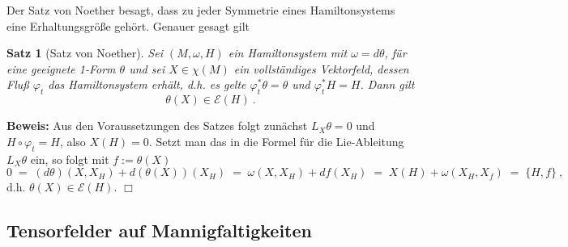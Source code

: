 \documentclass[12pt,a4paper]{article}
\newtheorem{Satz}[Lemma]{Satz}
\def\proof{\noindent\textbf{Beweis:}\quad}
\def\qed{\quad\hfill\ensuremath{\Box}}
\begin{document}
\bigskip

Der Satz von Noether besagt, dass zu jeder Symmetrie eines Hamiltonsystems eine Erhaltungsgr\"o\ss e
geh\"ort. Genauer gesagt gilt

\begin{Satz}[Satz von Noether]
Sei $(M, \omega, H)$ ein Hamiltonsystem mit $\omega = d\theta$, f\"ur eine geeignete 1-Form $\theta$
und sei $X\in \chi(M)$ ein vollst\"andiges Vektorfeld, dessen Flu\ss{} $\varphi_t$ das Hamiltonsystem
erh\"alt, d.h. es gelte $\varphi_t^*\theta = \theta$ und $\varphi_t^* H = H$. Dann gilt
$$
\theta(X) \in \mathcal E(H) \ .
$$
\end{Satz}
\proof
Aus den Voraussetzungen des Satzes folgt zun\"achst $L_X \theta = 0$ und $H \circ \varphi_t = H$, also
$X(H)=0$. Setzt man das in die Formel f\"ur die Lie-Ableitung $L_X\theta$ ein, so folgt mit $f:= \theta(X)$
$$
0 \;=\; (d\theta)(X, X_H ) + d(\theta(X))(X_H) \;=\; \omega (X, X_H) + df(X_H)
\;=\; X(H) + \omega(X_H, X_f) \;=\; \{H, f\} \ ,
$$
d.h. $\theta(X) \in \mathcal E (H)$.
\qed

\subsection{Tensorfelder auf Mannigfaltigkeiten}

\newcommand{\setd}[1]{\{#1\}}
\newcommand{\CC}{\mathcal{C}}
\newcommand{\ph}{\varphi}
\newcommand{\df}{\mathrm{d}f}
\newcommand{\dx}{\mathrm{d}x}
\newcommand{\dy}{\mathrm{d}y}
\newcommand{\dr}{\mathrm{d}r}
\newcommand{\dt}{\mathrm{d}t}
\newcommand{\diffd}{\mathrm{d}}
\newcommand{\dph}{\mathrm{d}\ph}
\newcommand{\domega}{\mathrm{d}\omega}
\newcommand{\scp}[1]{\left\langle#1\right\rangle}
\newcommand{\setdef}[2]{\left\{#1\;|\; #2\right\}}
\newcommand{\norm}[1]{\left\|#1\right\|}
\end{document}
